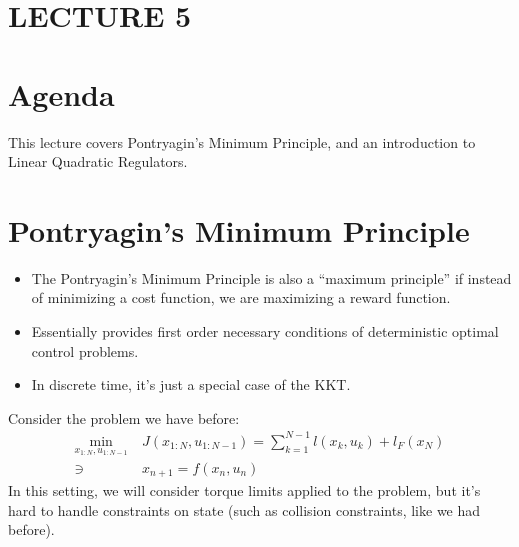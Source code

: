 \newpage
\section{LECTURE 5}

\section{Agenda}
This lecture covers Pontryagin's Minimum Principle, and an introduction to Linear Quadratic Regulators. 

\section{Pontryagin's Minimum Principle}
\begin{itemize}
    \item The Pontryagin's Minimum Principle is also a ``maximum principle'' if instead of minimizing a cost function, we are maximizing a reward function. 
    \item Essentially provides first order necessary conditions of deterministic optimal control problems. 
    \item In discrete time, it's just a special case of the KKT. 
\end{itemize}
Consider the problem we have before: 
\begin{align}
    \min_{x_{1:N}, u_{1:N-1}} \ & J(x_{1:N}, u_{1:N-1}) = \sum_{k=1}^{N-1} l(x_k, u_k) + l_F(x_N) \\
    \ni \ & x_{n+1} = f(x_n,u_n)
\end{align}
In this setting, we will consider torque limits applied to the problem, but it's hard to handle constraints on state (such as collision constraints, like we had before). 

